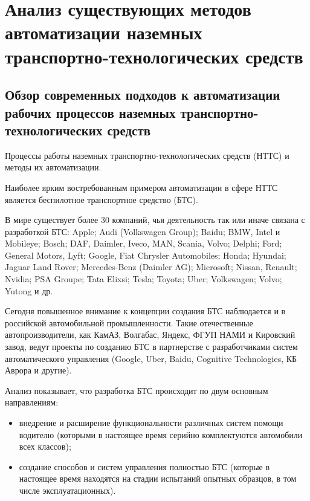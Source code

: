 \chapter{Анализ существующих методов автоматизации наземных транспортно-технологических средств}\label{ch:ch1}

\section{Обзор современных подходов к автоматизации рабочих процессов наземных транспортно-технологических средств}\label{sec:ch1/sec1}

Процессы работы наземных транспортно-технологических средств (НТТС) и методы их автоматизации.

Наиболее ярким востребованным примером автоматизации в сфере НТТС является беспилотное транспортное средство (БТС).

В мире существует более 30 компаний, чья деятельность так или иначе связана с разработкой БТС: Apple; Audi (Volkswagen Group); Baidu; BMW, Intel и Mobileye; Bosch; DAF, Daimler, Iveco, MAN, Scania, Volvo; Delphi; Ford; General Motors, Lyft; Google, Fiat Chrysler Automobiles; Honda; Hyundai; Jaguar Land Rover; Mercedes-Benz (Daimler AG); Microsoft; Nissan, Renault; Nvidia; PSA Groupe; Tata Elixsi; Tesla; Toyota; Uber; Volkswagen; Volvo; Yutong и др.

Сегодня повышенное внимание к концепции создания БТС наблюдается и в российской автомобильной промышленности. Такие отечественные автопроизводители, как КамАЗ, Волгабас, Яндекс, ФГУП НАМИ и Кировский завод, ведут проекты по созданию БТС в партнерстве с разработчиками систем автоматического управления (Google, Uber, Baidu, Cognitive Technologies, КБ Аврора и другие).

Анализ показывает, что разработка БТС происходит по двум основным направлениям:

\begin{itemize}
    \item внедрение и расширение функциональности различных систем помощи водителю (которыми в настоящее время серийно комплектуются автомобили всех классов);
    \item создание способов и систем управления полностью БТС (которые в настоящее время находятся на стадии испытаний опытных образцов, в том числе эксплуатационных).
\end{itemize}

